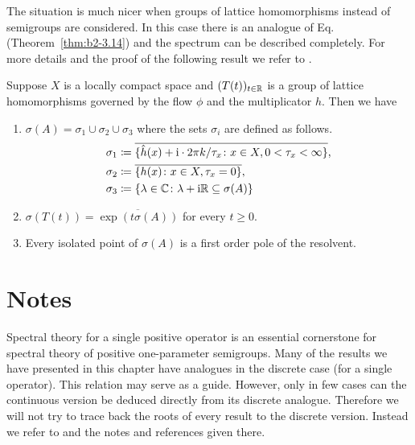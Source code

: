 The situation is much nicer when groups of lattice homomorphisms instead of semigroups are considered.
In this case there is an analogue of Eq.~ (\cf Theorem~\ref{thm:b2-3.14}) and the spectrum can be described completely.
For more details and the proof of the following result we refer to \textcite{arendtgreiner:1984}.
\begin{theorem}\label{thm:b3-4.11}
	Suppose $X$ is a locally compact space and $(T(t))_{t\in\mathbb{R}}$ is a group of lattice homomorphisms
    governed by the flow $\phi$ and the multiplicator $h$.
	Then we have
	\begin{enumerate}[\upshape (i)]
		\item 
		$\sigma(A) = \sigma_{1}\cup\sigma_{2}\cup\sigma_{3}$ where the sets $\sigma_{i}$ are defined as follows.
		\[\begin{aligned}
			\sigma_{1} &\coloneq \overline{\{\hat{h}(x) + \mathrm{i}\cdot 2\pi k/\tau_{x} \colon x \in X, 0 < \tau_{x} < \infty\}} , \\
			\sigma_{2} &\coloneq \overline{\{h(x) \colon x \in X, \tau_{x} = 0\}} ,  \\
			\sigma_{3} &\coloneq \{\lambda \in \mathbb{C} \colon \lambda + \mathrm{i}\mathbb{R} \subseteq \sigma(A)\}
		\end{aligned}\]
		
		\item 
		$\sigma(T(t)) = \overline{\exp(t\sigma(A))}$ for every $t \geq 0$.
		
		\item 
		Every isolated point of\/ $\sigma(A)$ is a first order pole of the resolvent.
	\end{enumerate}
\end{theorem}
\section*{Notes}
Spectral theory for a single positive operator is an essential cornerstone for spectral theory of positive one-parameter semigroups.
Many of the results we have presented in this chapter have analogues in the discrete case (\ie for a single operator).
This relation may serve as a guide.
However, only in few cases can the continuous version be deduced directly from its discrete analogue.
Therefore we will not try to trace back the roots of every result to the discrete version.
Instead we refer to \textcite{schaefer:1974} and the notes and references given there.

